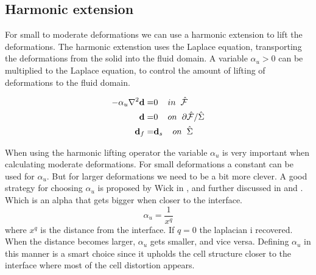 \subsection{Harmonic extension}
For small to moderate deformations we can use a harmonic extension to lift the deformations. The harmonic extenstion uses the Laplace equation, transporting the deformations from the solid into the fluid domain. A variable $\alpha_u > 0$ can be multiplied to the Laplace equation, to control the amount of lifting of deformations to the fluid domain.

\begin{align}
 - \alpha_u \nabla^2 \bold{d} =& 0\hspace{4mm} in \hspace{2mm} \hat{\mathcal{F}}\\
  \hspace{4mm} \bold{d} =& 0 \hspace{4mm } on \hspace{2mm }  \partial \hat{\mathcal{F}} / \hat{\Sigma} \\
  \bold{d}_f =& \bold{d}_s \hspace{4mm } on \hspace{2mm } \hat{\Sigma} 
\end{align}

When using the harmonic lifting operator the variable $\alpha_u$ is very important when calculating moderate deformations. For small deformations a constant can be used for $\alpha_u$. But for larger deformations we need to be a bit more clever. A good strategy for choosing $\alpha_u$ is proposed by Wick in \cite{Wick2011a}, and further discussed in \cite{Stein2003} and \cite{MM2016}. Which is an alpha that gets bigger when closer to the interface. 
\begin{equation}
\alpha_u = \frac{1}{x^q}
\end{equation}
where $x^q$ is the distance from the interface. If $q=0$ the laplacian i recovered. When the distance becomes larger, $\alpha_u$ gets smaller, and vice versa. 
Defining $\alpha_u$ in this manner is a smart choice since it upholds the cell structure closer to the interface where most of the cell distortion appears. 

